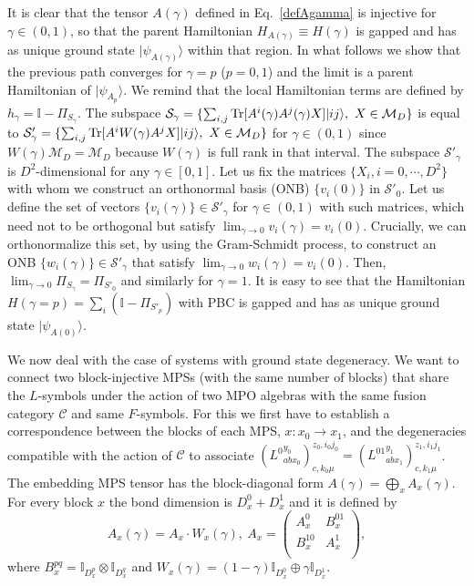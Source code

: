 \documentclass[a4paper,twocolumn,11pt,accepted=2023-02-10]{quantumarticle}
\newcommand{\tr}{{\rm Tr}}
\newcommand{\id}{\mathbb{I}}
\begin{document}
It is clear that the tensor $A(\gamma)$ defined in Eq.\ \eqref{defAgamma} is injective for $\gamma \in (0,1)$, so that the parent Hamiltonian $H_{A(\gamma)} \equiv H(\gamma)$ is gapped and has as unique ground state $|\psi_{A(\gamma)} \rangle$ within that region. 
In what follows we show that the previous path converges for $\gamma =p$ ($p=0,1$) and the limit is a parent Hamiltonian of $|\psi_{A_p} \rangle$. We remind that the local Hamiltonian terms are defined by $h_\gamma = \id - \Pi_{S_\gamma}$. The subspace $\mathcal{S}_\gamma = \{ \sum_{i,j}\tr[A^i(\gamma) A^j(\gamma) X]|ij \rangle, \ X\in \mathcal{M}_D \}$ is equal to $\mathcal{S}'_\gamma = \{ \sum_{i,j}\tr[A^i W(\gamma) A^j X]|ij \rangle, \ X\in \mathcal{M}_D \}$ for $\gamma \in (0,1)$ since $W(\gamma) \mathcal{M}_D = \mathcal{M}_D$ because $W(\gamma)$ is full rank in that interval. The subspace $\mathcal{S}'_\gamma$ is $D^2$-dimensional for any $\gamma\in [0,1]$. Let us fix the matrices $\{X_i, i=0,\cdots, D^2\}$ with whom we construct an orthonormal basis (ONB) $\{ v_i(0) \}$ in $\mathcal{S}'_0$. Let us define the set of vectors $\{ v_i(\gamma) \} \in \mathcal{S}'_\gamma$ for $\gamma \in (0,1)$ with such matrices, which need not to be orthogonal but satisfy $\lim_{\gamma \to 0} v_i(\gamma) = v_i(0)$. Crucially, we can orthonormalize this set, by using the Gram-Schmidt process, to construct an ONB $\{ w_i(\gamma) \} \in \mathcal{S}'_\gamma$ that satisfy $\lim_{\gamma \to 0} w_i(\gamma) = v_i(0)$. Then, $\lim_{\gamma \to 0} \Pi_{S_\gamma} = \Pi_{S'_0}$ and similarly for $\gamma = 1$. It is easy to see that the Hamiltonian $H(\gamma = p) = \sum_i (\id - \Pi_{S'_p})$ with PBC is gapped and has as unique ground state $|\psi_{A(0)} \rangle$.


We now deal with the case of systems with ground state degeneracy. We want to connect two block-injective MPSs (with the same number of blocks) that share the $L$-symbols under the action of two MPO algebras with the same fusion category $\mathcal{C}$ and same $F$-symbols. For this we first have to establish a correspondence between the blocks of each MPS, $x:x_0 \to x_1$, and the degeneracies compatible with the action of $\mathcal{C}$ to associate $\left({L^0}_{abx_0}^{y_0} \right)_{c,k_0 \mu}^{z_0,i_0j_0} = \left({L^01}_{abx_1}^{y_1} \right)_{c,k_1 \mu}^{z_1,i_1j_1} $. The embedding MPS tensor has the block-diagonal form $A(\gamma)=\bigoplus_x A_x(\gamma)$. For every block $x$ the bond dimension is $D^0_x+D^1_x$ and it is defined by
$$A_x(\gamma)= A_x \cdot W_x(\gamma), \ A_x = 
  \begin{pmatrix}
    A^0_x &  B^{01}_x  \\
     B_x^{10} & A^1_x\\
  \end{pmatrix}, $$
where $B_x^{pq}= \id_{D^p_x}\otimes \id_{D_x^q}$ and $W_x(\gamma) = (1-\gamma)\id_{D_x^0}\oplus \gamma\id_{D_x^1}$.
\end{document}
